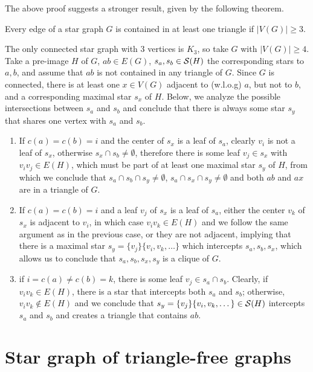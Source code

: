The above proof suggests a stronger result, given by the following theorem.

\begin{theorem}
    Every edge of a star graph $G$ is contained in at least one triangle if $|V(G)| \geq 3$.
\end{theorem}

\begin{tproof}
    The only connected star graph with 3 vertices is $K_3$, so take $G$ with $|V(G)| \geq 4$.
    Take a pre-image $H$ of $G$, $ab \in E(G)$, $s_a, s_b \in \mathcal{S}(H)$ the corresponding stars to $a, b$, and assume that $ab$ is not contained in any triangle of $G$.
    Since $G$ is connected, there is at least one $x \in V(G)$ adjacent to (w.l.o.g) $a$, but not to $b$, and a corresponding maximal star $s_x$ of $H$.
    Below, we analyze the possible intersections between $s_a$ and $s_b$ and conclude that there is always some star $s_y$ that shares one vertex with $s_a$ and $s_b$.
    \begin{enumerate}
        \item If $c(a) = c(b) = i$ and the center of $s_x$ is a leaf of $s_a$, clearly $v_i$ is not a leaf of $s_x$, otherwise $s_x \cap s_b \neq \emptyset$, therefore there is some leaf $v_j \in s_x$ with $v_iv_j \in E(H)$, which must be part of at least one maximal star $s_y$ of $H$, from which we conclude that $s_a \cap s_b \cap s_y \neq \emptyset$, $s_a \cap s_x \cap s_y \neq \emptyset$ and both $ab$ and $ax$ are in a triangle of $G$.
        \item If $c(a) = c(b) = i$ and a leaf $v_j$ of $s_x$ is a leaf of $s_a$, either the center $v_k$ of $s_x$ is adjacent to $v_i$, in which case $v_iv_k \in E(H)$ and we follow the same argument as in the previous case, or they are not adjacent, implying that there is a maximal star $s_y = \{v_j\}\{v_i, v_k, \dots\}$ which intercepts $s_a, s_b, s_x$, which allows us to conclude that $s_a, s_b, s_x, s_y$ is a clique of $G$.
        \item if $i = c(a) \neq c(b) = k$, there is some leaf $v_j \in s_a \cap s_b$. Clearly, if $v_iv_k \in E(H)$, there is a star that intercepts both $s_a$ and $s_b$;
        otherwise, $v_iv_k \notin E(H)$ and we conclude that $s_y = \{v_j\}\{v_i, v_k, \dots\} \in \mathcal{S}(H)$ intercepts $s_a$ and $s_b$ and creates a triangle that contains $ab$.
    \end{enumerate}
\end{tproof}

\section{Star graph of triangle-free graphs}



